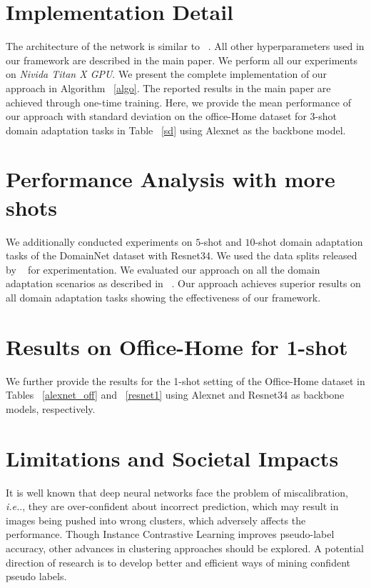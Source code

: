\section{Implementation Detail}
\label{imple}
The architecture of the network is similar to ~\cite{Saito2019SemiSupervisedDA}. All other hyperparameters used in our framework are described in the main paper. We perform all our experiments on \textit{Nivida Titan X GPU}.
We present the complete implementation of our approach in Algorithm ~\ref{algo}. The reported results in the main paper are achieved through one-time training. Here, we provide the mean performance of our approach with standard deviation on the office-Home dataset for 3-shot domain adaptation tasks in Table ~\ref{sd} using Alexnet as the backbone model.


\section{Performance Analysis with more shots}
We additionally conducted experiments on $5$-shot and $10$-shot domain adaptation tasks of the DomainNet dataset with Resnet34. We used the data splits released by ~\cite{Kim2020AttractPA} for experimentation. We evaluated our approach on all the domain adaptation scenarios as described in  ~\cite{Saito2019SemiSupervisedDA}. Our approach achieves superior results on all domain adaptation tasks showing the effectiveness of our framework.

\section{Results on Office-Home for 1-shot}
\label{office_home_1_shot}
We further provide the results for the 1-shot setting of the Office-Home dataset in Tables ~\ref{alexnet_off} and ~\ref{resnet1} using Alexnet and Resnet34 as backbone models, respectively.

\section{ Limitations and Societal Impacts}
It is well known that deep neural networks face the problem of miscalibration, \textit{i.e.}., they are over-confident about incorrect prediction, which may result in images being pushed into wrong clusters, which adversely affects the performance. Though Instance Contrastive Learning improves pseudo-label accuracy, other advances in clustering approaches should be explored. A potential direction of research is to develop better and efficient ways of mining confident pseudo labels.

